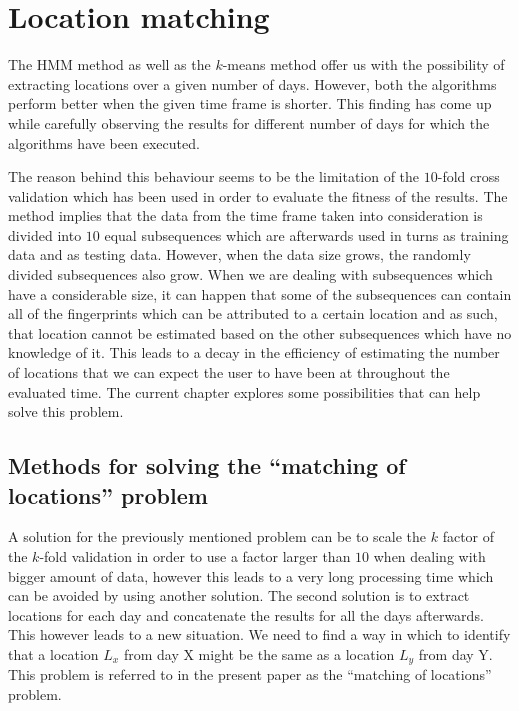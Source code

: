 \chapter{Location matching}
\label{ch_matching}

The HMM method as well as the $k$-means method offer us with the possibility of
extracting locations over a given number of days. However, both the algorithms
perform better when the given time frame is shorter. This finding has come up
while carefully observing the results for different number of days for which the
algorithms have been executed.

The reason behind this behaviour seems to be the limitation of the $10$-fold
cross validation which has been used in order to evaluate the fitness of the
results. The method implies that the data from the time frame taken into
consideration is divided into $10$ equal subsequences which are afterwards used
in turns as training data and as testing data. However, when the data size grows,
the randomly divided subsequences also grow. When we are dealing with
subsequences which have a considerable size, it can happen that some of the
subsequences can contain all of the fingerprints which can be attributed to a
certain location and as such, that location cannot be estimated based on the
other subsequences which have no knowledge of it. This leads to a decay in the
efficiency of estimating the number of locations that we can expect the user
to have been at throughout the evaluated time. The current chapter explores some
possibilities that can help solve this problem.

\section{Methods for solving the ``matching of locations'' problem}

A solution for the previously mentioned problem can be to scale the $k$ factor
of the $k$-fold validation in order to use a factor larger than $10$ when
dealing with bigger amount of data, however this leads to a very long processing
time which can be avoided by using another solution. The second solution is to
extract locations for each day and concatenate the results for all the days
afterwards. This however leads to a new situation. We need to find a way in
which to identify that a location $L_{x}$ from day X might be the same as a
location $L_{y}$ from day Y. This problem is referred to in the present paper as
the ``matching of locations'' problem.

